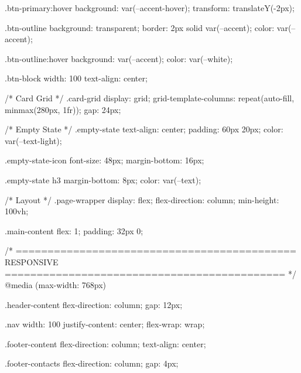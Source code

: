 .btn-primary:hover {
  background: var(--accent-hover);
  transform: translateY(-2px);
}

.btn-outline {
  background: transparent;
  border: 2px solid var(--accent);
  color: var(--accent);
}

.btn-outline:hover {
  background: var(--accent);
  color: var(--white);
}

.btn-block {
  width: 100%
  text-align: center;
}

/* Card Grid */
.card-grid {
  display: grid;
  grid-template-columns: repeat(auto-fill, minmax(280px, 1fr));
  gap: 24px;
}

/* Empty State */
.empty-state {
  text-align: center;
  padding: 60px 20px;
  color: var(--text-light);
}

.empty-state-icon {
  font-size: 48px;
  margin-bottom: 16px;
}

.empty-state h3 {
  margin-bottom: 8px;
  color: var(--text);
}

/* Layout */
.page-wrapper {
  display: flex;
  flex-direction: column;
  min-height: 100vh;
}

.main-content {
  flex: 1;
  padding: 32px 0;
}

/* ============================================
   RESPONSIVE
   ============================================ */
@media (max-width: 768px) {
  .header-content {
    flex-direction: column;
    gap: 12px;
  }

  .nav {
    width: 100%
    justify-content: center;
    flex-wrap: wrap;
  }

  .footer-content {
    flex-direction: column;
    text-align: center;
  }

  .footer-contacts {
    flex-direction: column;
    gap: 4px;
  }
}